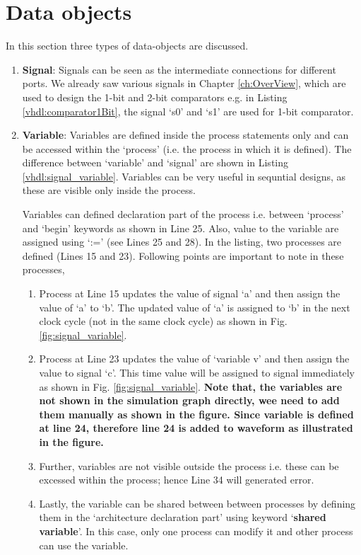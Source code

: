 \section{Data objects}\label{dataOjbects}
In this section three types of data-objects are discussed. 
\begin{enumerate}
	\item \textbf{Signal}: Signals can be seen as the intermediate connections for different ports. We already saw various signals in Chapter \ref{ch:OverView}, which are used to design the 1-bit and 2-bit comparators e.g. in Listing \ref{vhdl:comparator1Bit}, the signal `s0' and `s1' are used for 1-bit comparator. 
	
	\item \textbf{Variable}: Variables are defined inside the process statements only and can be accessed within the `process' (i.e. the process in which it is defined). The difference between `variable' and `signal' are shown in Listing \ref{vhdl:signal_variable}. Variables can be very useful in sequntial designs, as these are visible only inside the process. 
	
	\begin{explanation}
		Variables can defined declaration part of the process i.e. between `process' and `begin' keywords as shown in Line 25. Also, value to the variable are assigned using `:=' (see Lines 25 and 28). In the listing, two processes are defined (Lines 15 and 23). Following points are important to note in these processes, 
		\begin{enumerate}
			\item Process at Line 15 updates the value of signal `a' and then assign the value of `a' to `b'. The updated value of `a' is assigned to `b' in the next clock cycle (not in the same clock cycle) as shown in Fig. \ref{fig:signal_variable}. 
			\item Process at Line 23 updates the value of `variable v' and then assign the value to signal `c'. This time value will be assigned to signal immediately as shown in Fig. \ref{fig:signal_variable}. \textbf{Note that, the variables are not shown in the simulation graph directly, wee need to add them manually as shown in the figure. Since variable is defined at line 24, therefore line 24 is added to waveform as illustrated in the figure. }
			\item Further, variables are not visible outside the process i.e. these can be excessed within the process; hence Line 34 will generated error. 
				\item Lastly, the variable can be shared between between processes by defining them in the `architecture declaration part' using keyword `\textbf{shared variable}'. In this case, only one process can modify it and other process can use the variable. 
		\end{enumerate}		
	\end{explanation}
	

\end{enumerate}
